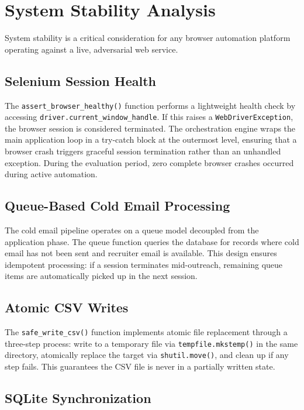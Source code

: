 \documentclass[12pt, a4paper, oneside]{report}
\begin{document}
\section{System Stability Analysis}
\label{sec:stability-analysis}

System stability is a critical consideration for any browser automation platform operating against a live, adversarial web service.

\subsection{Selenium Session Health}

The \texttt{assert\_browser\_healthy()} function performs a lightweight health check by accessing \texttt{driver.current\_window\_handle}. If this raises a \texttt{WebDriverException}, the browser session is considered terminated. The orchestration engine wraps the main application loop in a try-catch block at the outermost level, ensuring that a browser crash triggers graceful session termination rather than an unhandled exception. During the evaluation period, zero complete browser crashes occurred during active automation.

\subsection{Queue-Based Cold Email Processing}

The cold email pipeline operates on a queue model decoupled from the application phase. The queue function queries the database for records where cold email has not been sent and recruiter email is available. This design ensures idempotent processing: if a session terminates mid-outreach, remaining queue items are automatically picked up in the next session.

\subsection{Atomic CSV Writes}

The \texttt{safe\_write\_csv()} function implements atomic file replacement through a three-step process: write to a temporary file via \texttt{tempfile.mkstemp()} in the same directory, atomically replace the target via \texttt{shutil.move()}, and clean up if any step fails. This guarantees the CSV file is never in a partially written state.

\subsection{SQLite Synchronization}
\end{document}
